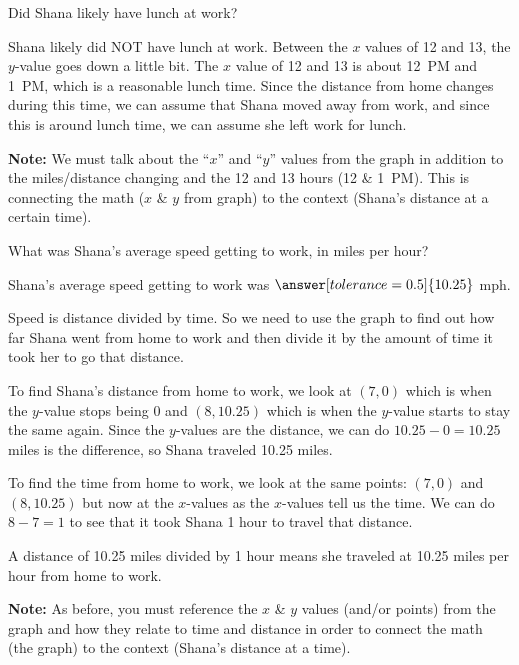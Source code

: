 \documentclass[12pt]{ximera}
\begin{document}
\begin{problem}
Did Shana likely have lunch at work?

\begin{freeResponse}
\end{freeResponse}

\begin{solution}
Shana likely did NOT have lunch at work. Between the $x$ values of 12 and 13, the
$y$-value goes down a little bit. The $x$ value of 12 and 13 is about 12~PM and 1~PM,
which is a reasonable lunch time. Since the distance from home changes during this
time, we can assume that Shana moved away from work, and since this is around lunch
time, we can assume she left work for lunch.

\textbf{Note:} We must talk about the ``$x$'' and ``$y$'' values from the graph in
addition to the miles/distance changing and the 12 and 13 hours (12 \& 1~PM). This is
connecting the math ($x$ \& $y$ from graph) to the context (Shana's distance at a
certain time).
\end{solution}
\end{problem}

\begin{problem}
What was Shana's average speed getting to work, in miles per hour?

Shana's average speed getting to work was $\answer[tolerance=0.5]{10.25}$ mph.

\begin{freeResponse}
\end{freeResponse}

\begin{solution}
Speed is distance divided by time. So we need to use the graph to find out how far
Shana went from home to work and then divide it by the amount of time it took her to
go that distance.

To find Shana's distance from home to work, we look at $(7,0)$ which is when the
$y$-value stops being 0 and $(8, 10.25)$ which is when the $y$-value starts to stay
the same again. Since the $y$-values are the distance, we can do $10.25 - 0 = 10.25$
miles is the difference, so Shana traveled 10.25 miles.

To find the time from home to work, we look at the same points: $(7,0)$ and
$(8,10.25)$ but now at the $x$-values as the $x$-values tell us the time. We can do
$8 - 7 = 1$ to see that it took Shana 1 hour to travel that distance.

A distance of 10.25 miles divided by 1 hour means she traveled at 10.25 miles per hour
from home to work.

\textbf{Note:} As before, you must reference the $x$ \& $y$ values (and/or points) from
the graph and how they relate to time and distance in order to connect the math (the
graph) to the context (Shana's distance at a time).
\end{solution}
\end{problem}
\end{document}
